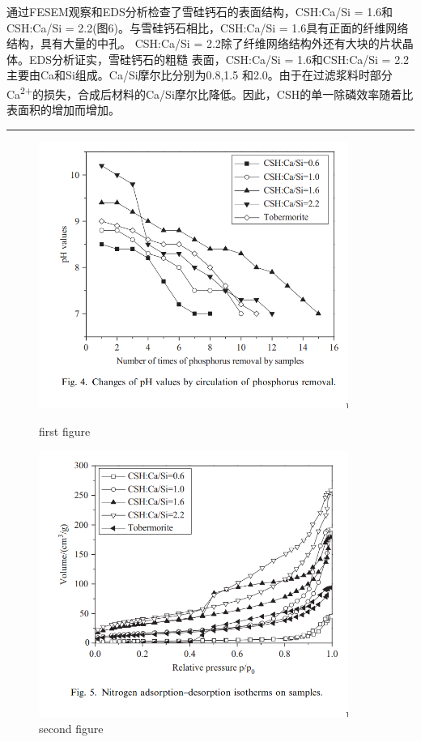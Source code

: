 \documentclass[11pt]{article}
\begin{document}
\setlength{\parindent}{1.0cm}
通过FESEM观察和EDS分析检查了雪硅钙石的表面结构，CSH:Ca/Si = 1.6和CSH:Ca/Si =
2.2(图6)。与雪硅钙石相比，CSH:Ca/Si = 1.6具有正面的纤维网络结构，具有大量的中孔。
CSH:Ca/Si = 2.2除了纤维网络结构外还有大块的片状晶体。EDS分析证实，雪硅钙石的粗糙
表面，CSH:Ca/Si = 1.6和CSH:Ca/Si = 2.2主要由Ca和Si组成。Ca/Si摩尔比分别为0.8,1.5
和2.0。由于在过滤浆料时部分Ca\textsuperscript{2+}的损失，合成后材料的Ca/Si摩尔比降低。因此，CSH的单一除磷效率随着比表面积的增加而增加。
\par

\noindent\rule{\textwidth}{0.5pt}

\begin{figure}
    \centering
    \begin{minipage}{0.45\textwidth}
        \centering
        \includegraphics[width=0.9\textwidth]{fig.4.png} %
        \caption{first figure}
    \end{minipage}\hfill
    \begin{minipage}{0.45\textwidth}
        \centering
        \includegraphics[width=0.9\textwidth]{fig.5.png} %
        \caption{second figure}
    \end{minipage}
\end{figure}
\end{document}
